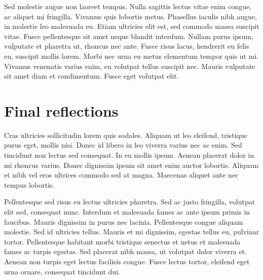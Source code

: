Sed molestie augue non laoreet tempus. Nulla sagittis lectus vitae enim congue, ac aliquet mi fringilla. Vivamus quis lobortis metus. Phasellus iaculis nibh augue, in molestie leo malesuada eu. Etiam ultricies elit est, sed commodo massa suscipit vitae. Fusce pellentesque sit amet neque blandit interdum. Nullam purus ipsum, vulputate et pharetra ut, rhoncus nec ante. Fusce risus lacus, hendrerit eu felis eu, suscipit mollis lorem. Morbi nec urna eu metus elementum tempor quis ut mi. Vivamus venenatis varius enim, eu volutpat tellus suscipit nec. Mauris vulputate sit amet diam et condimentum. Fusce eget volutpat elit. 

\section{Final reflections}

 Cras ultricies sollicitudin lorem quis sodales. Aliquam ut leo eleifend, tristique purus eget, mollis nisi. Donec id libero in leo viverra varius nec ac enim. Sed tincidunt non lectus sed consequat. In eu mollis ipsum. Aenean placerat dolor in mi rhoncus varius. Donec dignissim ipsum sit amet enim auctor lobortis. Aliquam et nibh vel eros ultrices commodo sed at magna. Maecenas aliquet ante nec tempus lobortis.

Pellentesque sed risus eu lectus ultricies pharetra. Sed ac justo fringilla, volutpat elit sed, consequat nunc. Interdum et malesuada fames ac ante ipsum primis in faucibus. Mauris dignissim in purus nec lacinia. Pellentesque congue aliquam molestie. Sed id ultricies tellus. Mauris et mi dignissim, egestas tellus eu, pulvinar tortor. Pellentesque habitant morbi tristique senectus et netus et malesuada fames ac turpis egestas. Sed placerat nibh massa, ut volutpat dolor viverra et. Aenean non turpis eget lectus facilisis congue. Fusce lectus tortor, eleifend eget urna ornare, consequat tincidunt dui. 